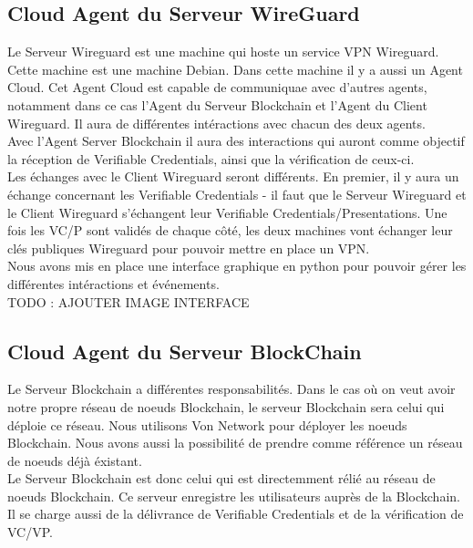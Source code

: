 \documentclass[12pt, openany]{report}
\begin{document}
\subsection{Cloud Agent du Serveur WireGuard}
\noindent 
\begin{flushleft}
Le Serveur Wireguard est une machine qui hoste un service VPN Wireguard. Cette machine est une machine Debian. Dans cette machine il y a aussi un Agent Cloud. Cet Agent Cloud est capable de communiquae avec d'autres agents, notamment dans ce cas l'Agent du Serveur Blockchain et l'Agent du Client Wireguard. Il aura de différentes intéractions avec chacun des deux agents. \\
Avec l'Agent Server Blockchain il aura des interactions qui auront comme objectif la réception de Verifiable Credentials, ainsi que la vérification de ceux-ci. \\
Les échanges avec le Client Wireguard seront différents. En premier, il y aura un échange concernant les Verifiable Credentials - il faut que le Serveur Wireguard et le Client Wireguard s'échangent leur Verifiable Credentials/Presentations. Une fois les VC/P sont validés de chaque côté, les deux machines vont échanger leur clés publiques Wireguard pour pouvoir mettre en place un VPN. \\
Nous avons mis en place une interface graphique en python pour pouvoir gérer les différentes intéractions et événements.\\
TODO : AJOUTER IMAGE INTERFACE 
\end{flushleft}

\subsection{Cloud Agent du Serveur BlockChain}
\noindent 
\begin{flushleft}
Le Serveur Blockchain a différentes responsabilités. Dans le cas où on veut avoir notre propre réseau de noeuds Blockchain, le serveur Blockchain sera celui qui déploie ce réseau. Nous utilisons Von Network pour déployer les noeuds Blockchain. Nous avons aussi la possibilité de prendre comme référence un réseau de noeuds déjà éxistant. \\
Le Serveur Blockchain est donc celui qui est directemment rélié au réseau de noeuds Blockchain. Ce serveur enregistre les utilisateurs auprès de la Blockchain. Il se charge aussi de la délivrance de Verifiable Credentials et de la vérification de VC/VP. \\

\end{flushleft}
\end{document}

